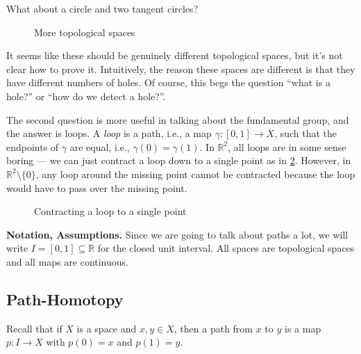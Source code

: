 \documentclass{article}
\theoremstyle{definition}
\theoremstyle{remark}
\newcommand{\R}{\mathbb R}
\numberwithin{figure}{section}
\begin{document}
What about a circle and two tangent circles?

\begin{figure}[h]
	\centering
	\caption{More topological spaces}
	\label{fig:topex-1d}
\end{figure}

It seems like these should be genuinely different topological spaces, but it's not clear how to prove it. Intuitively, the reason these spaces are different is that they have different numbers of holes. Of course, this begs the question ``what is a hole?'' or ``how do we detect a hole?''.

The second question is more useful in talking about the fundamental group, and the answer is loops. A \emph{loop} is a path, i.e., a map $\gamma : [0, 1] \to X$, such that the endpoints of $\gamma$ are equal, i.e., $\gamma(0) = \gamma(1)$. In $\R^2$, all loops are in some sense boring --- we can just contract a loop down to a single point as in \cref{fig:contracting loop}. However, in $\R^2 \setminus \{0\}$, any loop around the missing point cannot be contracted because the loop would have to pass over the missing point.

\begin{figure}[h]
	\centering
	\caption{Contracting a loop to a single point}
	\label{fig:contracting loop}
\end{figure}

\medskip\noindent
\textbf{Notation, Assumptions.} Since we are going to talk about paths a lot, we will write $I = [0, 1] \subseteq \R$ for the closed unit interval. All spaces are topological spaces and all maps are continuous.

\subsection{Path-Homotopy}
Recall that if $X$ is a space and $x, y \in X$, then a path from $x$ to $y$ is a map $p : I \to X$ with $p(0) = x$ and $p(1) = y$.
\end{document}
